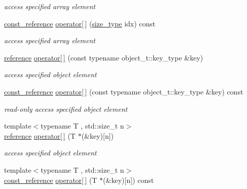 \begin{DoxyCompactItemize}
\begin{DoxyCompactList}\small\item\em access specified array element \end{DoxyCompactList}\item 
\mbox{\hyperlink{classnlohmann_1_1basic__json_a4057c5425f4faacfe39a8046871786ca}{const\+\_\+reference}} \mbox{\hyperlink{classnlohmann_1_1basic__json_a9cb592cd85c14f3e845e30d51cf17efb}{operator\mbox{[}$\,$\mbox{]}}} (\mbox{\hyperlink{classnlohmann_1_1basic__json_a39f2cd0b58106097e0e67bf185cc519b}{size\+\_\+type}} idx) const
\begin{DoxyCompactList}\small\item\em access specified array element \end{DoxyCompactList}\item 
\mbox{\hyperlink{classnlohmann_1_1basic__json_ac6a5eddd156c776ac75ff54cfe54a5bc}{reference}} \mbox{\hyperlink{classnlohmann_1_1basic__json_a233b02b0839ef798942dd46157cc0fe6}{operator\mbox{[}$\,$\mbox{]}}} (const typename object\+\_\+t\+::key\+\_\+type \&key)
\begin{DoxyCompactList}\small\item\em access specified object element \end{DoxyCompactList}\item 
\mbox{\hyperlink{classnlohmann_1_1basic__json_a4057c5425f4faacfe39a8046871786ca}{const\+\_\+reference}} \mbox{\hyperlink{classnlohmann_1_1basic__json_ab2318780e5ae692039e816b6ac32c91e}{operator\mbox{[}$\,$\mbox{]}}} (const typename object\+\_\+t\+::key\+\_\+type \&key) const
\begin{DoxyCompactList}\small\item\em read-\/only access specified object element \end{DoxyCompactList}\item 
{\footnotesize template$<$typename T , std\+::size\+\_\+t n$>$ }\\\mbox{\hyperlink{classnlohmann_1_1basic__json_ac6a5eddd156c776ac75ff54cfe54a5bc}{reference}} \mbox{\hyperlink{classnlohmann_1_1basic__json_a1416bbec9d9a8eeca21c213cf5290868}{operator\mbox{[}$\,$\mbox{]}}} (T $\ast$(\&key)\mbox{[}n\mbox{]})
\begin{DoxyCompactList}\small\item\em access specified object element \end{DoxyCompactList}\item 
{\footnotesize template$<$typename T , std\+::size\+\_\+t n$>$ }\\\mbox{\hyperlink{classnlohmann_1_1basic__json_a4057c5425f4faacfe39a8046871786ca}{const\+\_\+reference}} \mbox{\hyperlink{classnlohmann_1_1basic__json_ab17b18f161ecd014074790e25449094a}{operator\mbox{[}$\,$\mbox{]}}} (T $\ast$(\&key)\mbox{[}n\mbox{]}) const

\end{DoxyCompactItemize}
